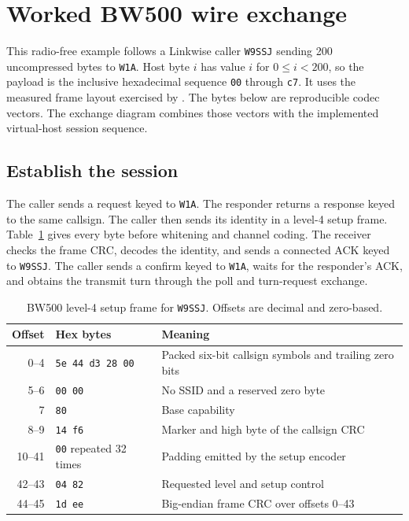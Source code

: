 \section{Worked BW500 wire exchange}
\label{app:bw500-wire}

This radio-free example follows a Linkwise caller \texttt{W9SSJ} sending
200 uncompressed bytes to \texttt{W1A}. Host byte $i$ has value $i$ for
$0\le i<200$, so the payload is the inclusive hexadecimal sequence
\texttt{00} through \texttt{c7}. It uses the measured frame layout exercised
by .
The bytes below are reproducible codec vectors. The exchange diagram
combines those vectors with the implemented virtual-host session sequence.

\subsection{Establish the session}

The caller sends a request keyed to \texttt{W1A}. The responder returns a
response keyed to the same callsign. The caller then sends its identity
in a level-4 setup frame. Table~\ref{tab:worked-bw500-setup} gives every
byte before whitening and channel coding. The receiver checks the frame
CRC, decodes the identity, and sends a connected ACK keyed to \texttt{W9SSJ}.
The caller sends a confirm keyed to \texttt{W1A}, waits for the responder's
ACK, and obtains the transmit turn through the poll and turn-request exchange.

\begin{table}[htbp]
\centering\small
\begin{tabular}{@{}rll@{}}
\toprule
Offset & Hex bytes & Meaning \\
\midrule
0--4 & \texttt{5e 44 d3 28 00} & Packed six-bit callsign symbols and trailing zero bits \\
5--6 & \texttt{00 00} & No SSID and a reserved zero byte \\
7 & \texttt{80} & Base capability \\
8--9 & \texttt{14 f6} & Marker and high byte of the callsign CRC \\
10--41 & \texttt{00} repeated 32 times & Padding emitted by the setup encoder \\
42--43 & \texttt{04 82} & Requested level and setup control \\
44--45 & \texttt{1d ee} & Big-endian frame CRC over offsets 0--43 \\
\bottomrule
\end{tabular}
\caption{BW500 level-4 setup frame for \texttt{W9SSJ}. Offsets are decimal and zero-based.}
\label{tab:worked-bw500-setup}
\end{table}

